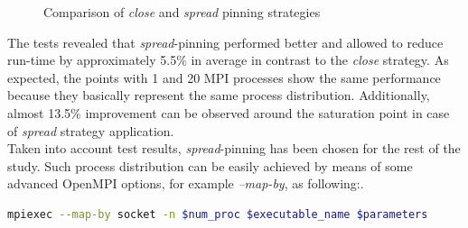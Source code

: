 \begin{figure}
\begin{tabular}{cc}
	\end{tabular}
	\caption{Comparison of \textit{close} and \textit{spread} pinning strategies}
	\label{fig:mumps-close-vs-spread}
\end{figure}


The tests revealed that \textit{spread}-pinning performed better and allowed to reduce run-time by approximately 5.5\% in average in contrast to the \textit{close} strategy. As expected, the points with 1 and 20 MPI processes show the same performance because they basically represent the same process distribution. Additionally, almost 13.5\% improvement can be observed around the saturation point in case of \textit{spread} strategy application.\\

Taken into account test results, \textit{spread}-pinning has been chosen for the rest of the study. Such process distribution can be easily achieved by means of some advanced OpenMPI options, for example \textit{--map-by}, as following:. \\

\begin{lstlisting}[language=bash, caption={An example of \textit{spread}-pinning with using OpenMPI options in case of a flat-MPI run}, frame=single, label={lst:iterative-refinement}]
mpiexec --map-by socket -n $num_proc $executable_name $parameters
\end{lstlisting}
